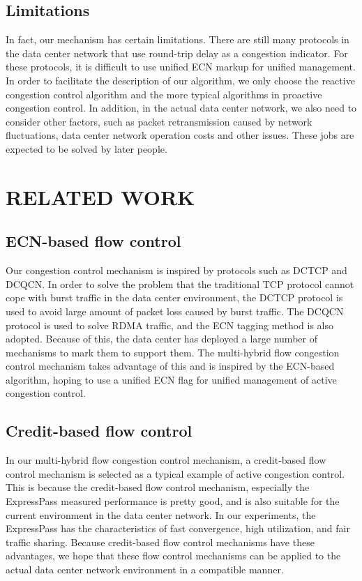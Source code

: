 \documentclass[conference]{IEEEtran}
\begin{document}
\subsection{Limitations}In fact, our mechanism has certain limitations. There are still many protocols in the data center network that use round-trip delay as a congestion indicator. For these protocols, it is difficult to use unified ECN markup for unified management. In order to facilitate the description of our algorithm, we only choose the reactive congestion control algorithm and the more typical algorithms in proactive congestion control. In addition, in the actual data center network, we also need to consider other factors, such as packet retransmission caused by network fluctuations, data center network operation costs and other issues. These jobs are expected to be solved by later people.
\section{RELATED WORK}
\subsection{ECN-based flow control}Our congestion control mechanism is inspired by protocols such as DCTCP and DCQCN. In order to solve the problem that the traditional TCP protocol cannot cope with burst traffic in the data center environment, the DCTCP protocol is used to avoid large amount of packet loss caused by burst traffic. The DCQCN protocol is used to solve RDMA traffic, and the ECN tagging method is also adopted. Because of this, the data center has deployed a large number of mechanisms to mark them to support them. The multi-hybrid flow congestion control mechanism takes advantage of this and is inspired by the ECN-based algorithm, hoping to use a unified ECN flag for unified management of active congestion control.
\subsection{Credit-based flow control}In our multi-hybrid flow congestion control mechanism, a credit-based flow control mechanism is selected as a typical example of active congestion control. This is because the credit-based flow control mechanism, especially the ExpressPass measured performance is pretty good, and is also suitable for the current environment in the data center network. In our experiments, the ExpressPass has the characteristics of fast convergence, high utilization, and fair traffic sharing. Because credit-based flow control mechanisms have these advantages, we hope that these flow control mechanisms can be applied to the actual data center network environment in a compatible manner.
\end{document}

